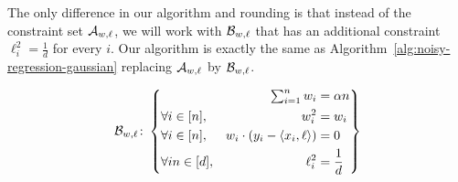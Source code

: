 






The only  difference in our algorithm and rounding is that instead of the constraint set $\mathcal A_{w,\ell}$, we will work with $\mathcal B_{w,\ell}$  that has an additional constraint $\ell_i^2 = \frac{1}{d}$ for every $i$. Our algorithm is exactly the same as Algorithm~\ref{alg:noisy-regression-gaussian} replacing $\mathcal A_{w,\ell}$ by $\mathcal B_{w,\ell}$.

\begin{equation}
  \mathcal B_{w,\ell}\colon
  \left \{
    \begin{aligned}
      &&
      \textstyle\sum_{i=1}^n w_i
      &= \alpha n\\
      &\forall i\in [n],
      & w_i^2
      & =w_i \\
      &\forall i\in [n],
      & w_i \cdot (y_i - \langle x_i,\ell\rangle)
      & = 0\\
      &\forall in \in [d],
      &\ell_i^2 &= \frac{1}{d}\\
    \end{aligned}
  \right \}
\end{equation} 

